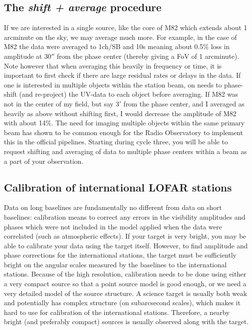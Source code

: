 \subsection{The \emph{shift + average} procedure}
\label{sect:shift+average}
If we are interested in a single source, like the core of M82 which extends
about 1 arcminute on the sky, we may average much more. For example, in the
case of M82 the data were averaged to 1ch/SB and 10s meaning about 0.5\% loss
in amplitude at 30$''$ from the phase center (thereby giving a FoV of 1
arcminute).  Note however that when averaging this heavily in frequency or
time, it is important to first check if there are large residual rates or
delays in the data.
If one is interested in multiple objects within the station beam, on needs to
phase-shift (and re-project) the UV-data to each object before averaging.  If
M82 was not in the center of my field, but say 3$'$ from the phase center, and
I averaged as heavily as above without shifting first, I would decrease the
amplitude of M82 with about 14\%.  The need for imaging multiple objects within
the same primary beam has shown to be common enough for the Radio Observatory
to implement this in the official pipelines. Starting during cycle three, you
will be able to request shifting and averaging of data to multiple phase
centers within a beam as a part of your observation. 

\subsection{Calibration of international LOFAR stations}
\label{sect:cal}
Data on long baselines are fundamentally no different from data on short
baselines: calibration means to correct any errors in the visibility amplitudes
and phases which were not included in the model applied when the data were
correlated (such as atmospheric effects).  If your target is very bright, you
may be able to calibrate your data using the target itself.  However, to find
amplitude and phase corrections for the international stations, the target must
be sufficiently bright on the angular scales measured by the baselines to the
international stations.  Because of the high resolution, calibration needs to
be done using either a very compact source so that a point source model is good
enough, or we need a very detailed model of the source structure. A science
target is usually both weak and potentially has complex structure (on
subarcsecond scales), which makes it hard to use for calibration of the
international stations. Therefore, a nearby bright (and preferably compact)
sources is usually observed along with the target. 

